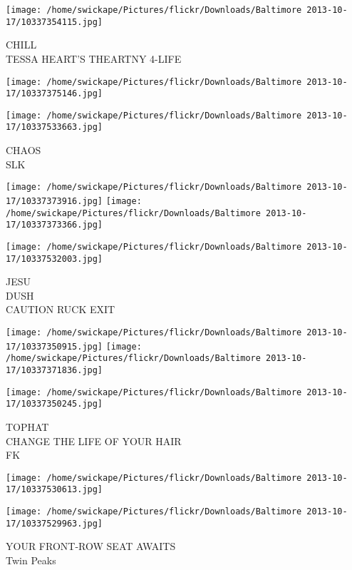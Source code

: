 \documentclass[10pt,letterpaper]{article}
\begin{document}
\vspace{0.25in}
\texttt{[image: /home/swickape/Pictures/flickr/Downloads/Baltimore 2013-10-17/10337354115.jpg]}

CHILL\\
TESSA HEART'S THEARTNY 4{-}LIFE\\
\pagebreak

\texttt{[image: /home/swickape/Pictures/flickr/Downloads/Baltimore 2013-10-17/10337375146.jpg]}

\vspace{0.25in}
\texttt{[image: /home/swickape/Pictures/flickr/Downloads/Baltimore 2013-10-17/10337533663.jpg]}

CHAOS\\
SLK\\
\pagebreak

\texttt{[image: /home/swickape/Pictures/flickr/Downloads/Baltimore 2013-10-17/10337373916.jpg]}
\texttt{[image: /home/swickape/Pictures/flickr/Downloads/Baltimore 2013-10-17/10337373366.jpg]}

\vspace{0.25in}
\texttt{[image: /home/swickape/Pictures/flickr/Downloads/Baltimore 2013-10-17/10337532003.jpg]}

JESU\\
DUSH\\
CAUTION RUCK EXIT\\
\pagebreak

\texttt{[image: /home/swickape/Pictures/flickr/Downloads/Baltimore 2013-10-17/10337350915.jpg]}
\texttt{[image: /home/swickape/Pictures/flickr/Downloads/Baltimore 2013-10-17/10337371836.jpg]}

\texttt{[image: /home/swickape/Pictures/flickr/Downloads/Baltimore 2013-10-17/10337350245.jpg]}

TOPHAT\\
CHANGE THE LIFE OF YOUR HAIR\\
FK\\
\pagebreak

\texttt{[image: /home/swickape/Pictures/flickr/Downloads/Baltimore 2013-10-17/10337530613.jpg]}

\vspace{0.25in}
\texttt{[image: /home/swickape/Pictures/flickr/Downloads/Baltimore 2013-10-17/10337529963.jpg]}

YOUR FRONT{-}ROW SEAT AWAITS\\
Twin Peaks\\
\pagebreak
\end{document}
